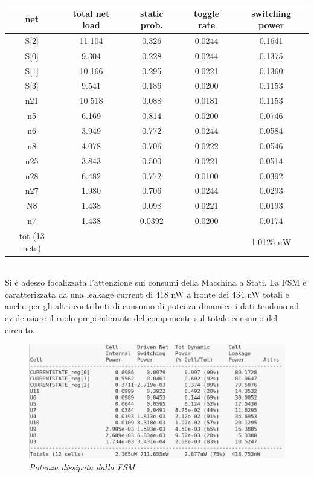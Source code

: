 \begin{table}[!h]\footnotesize
	\centering
	\begin{tabular}{|c|c|c|c|c|}
		\hline
		\textbf{net} & \textbf{total net load} & \textbf{static prob.} & \textbf{toggle rate}& \textbf{switching power}\\
		\hline
		S[2] & 11.104 & 0.326 & 0.0244 & 0.1641\\
		\hline
		S[0] & 9.304 & 0.228 & 0.0244 & 0.1375\\
		\hline
		S[1] & 10.166 & 0.295 & 0.0221 & 0.1360\\
		\hline
		S[3] & 9.541 & 0.186 & 0.0200 & 0.1153\\
		\hline
		n21 & 10.518 & 0.088 & 0.0181 & 0.1153\\
		\hline
		n5 & 6.169 & 0.814 & 0.0200 & 0.0746\\
		\hline
		n6 & 3.949 & 0.772 & 0.0244 & 0.0584\\
		\hline
		n8 & 4.078 & 0.706 & 0.0222 & 0.0546\\
		\hline
		n25 & 3.843 & 0.500 & 0.0221 & 0.0514\\
		\hline
		n28 & 6.482 & 0.772 & 0.0100 & 0.0392\\
		\hline
		n27 & 1.980 & 0.706 & 0.0244 & 0.0293\\
		\hline
		N8 & 1.438 & 0.098 & 0.0221 & 0.0193\\
		\hline
		n7 & 1.438 & 0.0392 & 0.0200 & 0.0174\\
		\hline
		\hline
		tot (13 nets) &  &  &  & 1.0125 uW\\
		\hline 
	\end{tabular}
\end{table} \\
Si è adesso focalizzata l’attenzione sui consumi della Macchina a Stati. La FSM è caratterizzata da una leakage current di 418 nW a fronte dei 434 nW totali e anche per gli altri contributi di consumo di potenza dinamica i dati tendono ad evidenziare il ruolo preponderante del componente sul totale consumo del circuito. 
\\
\begin{figure}[!htb]
	\centering
	\includegraphics[scale=0.6]{immagini/fsm_power_cell}
	\caption{\textit{Potenza dissipata dalla FSM}}
	\label{datapath}
\end{figure} \\
